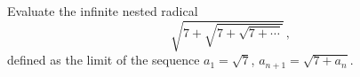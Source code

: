 Evaluate the infinite nested radical
\[
\sqrt{7+\sqrt{7+\sqrt{7+\cdots}}}\,,
\]
defined as the limit of the sequence $a_1=\sqrt7$, $a_{n+1}=\sqrt{7+a_n}$.
